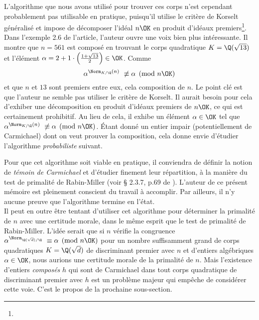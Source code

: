 L'algorithme que nous avons utilisé pour trouver ces corps n'est cependant probablement pas utilisable en pratique, puisqu'il utilise le critère de Korselt généralisé et impose de décomposer l'idéal $n\OK$ en produit d'idéaux premiers\footnote{}. Dans l'exemple 2.6 de l'article, l'auteur ouvre une voix bien plus intéressante. Il montre que $n = 561$ est composé en trouvant le corps quadratique $K = \Q(\sqrt{13})$ et l'élément $\alpha = 2 + 1\cdot \left(\frac{1 + \sqrt{13}}{2}\right) \in \OK$. Comme $$\alpha^{\Norm_{K/\Q}(n)} \not \equiv \alpha \pmod{n\OK}$$ et que $n$ et $13$ sont premiers entre eux, cela composition de $n$. Le point clé est que l'auteur ne semble pas utiliser le critère de Korselt. Il aurait besoin pour cela d'exhiber une décomposition en produit d'idéaux premiers de $n\OK$, ce qui est certainement prohibitif. Au lieu de cela, il exhibe un élément $\alpha\in \OK$ tel que $\alpha^{\Norm_{K/\Q}(n)} \not \equiv \alpha \pmod{n\OK}$. Étant donné un entier impair (potentiellement de Carmichael) dont on veut prouver la composition, cela donne envie d'étudier l'algorithme \emph{probabiliste} suivant.

\vspace{1em}
\begin{algorithm}[H]\label{algo-quadratique-faible}
\end{algorithm}
\vspace{1em}

Pour que cet algorithme soit viable en pratique, il conviendra de définir la notion de \textit{témoin de Carmichael} et d'étudier finement leur répartition, à la manière du test de primalité de Rabin-Miller (voir § 2.3.7, p.69 de \cite{Demazure}). L'auteur de ce présent mémoire est pleinement conscient du travail à accomplir. Par ailleurs, il n'y aucune preuve que l'algorithme termine en l'état. \\

Il peut en outre être tentant d'utiliser cet algorithme pour déterminer la primalité de $n$ avec une certitude morale, dans le même esprit que le test de primalité de Rabin-Miller. L'idée serait que si $n$ vérifie la congruence $\alpha^{\Norm_{\Q(\sqrt{d})/\Q}} \equiv \alpha \pmod{n\OK}$ pour un nombre suffisamment grand de corps quadratiques $K = \Q(\sqrt{d})$ de discriminant premier avec $n$ et d'entiers algébriques $\alpha \in \OK$, nous aurions une certitude morale de la primalité de $n$. Mais l'existence d'entiers \emph{composés} $h$ qui sont de Carmichael dans tout corps quadratique de discriminant premier avec $h$ est un problème majeur qui empêche de considérer cette voie. C'est le propos de la prochaine sous-section.

